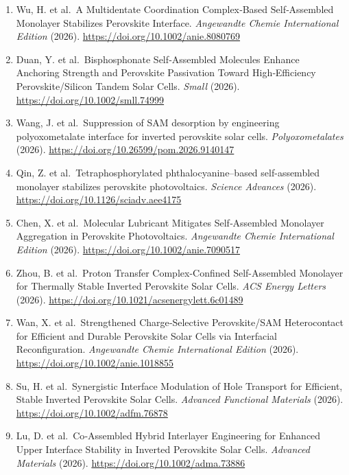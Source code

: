 \documentclass[
  11pt,
]{article}
\begin{document}
\begin{enumerate}
  Li, M. et al.~Improved Mechanical Adhesion Enabled by Bilayer Hole
  Transport Layers in Perovskite Solar Cells. \emph{ACS Materials
  Letters} (2026).
  \url{https://doi.org/10.1021/acsmaterialslett.6c00479}
\item
  Wu, H. et al.~A Multidentate Coordination Complex‐Based Self‐Assembled
  Monolayer Stabilizes Perovskite Interface. \emph{Angewandte Chemie
  International Edition} (2026).
  \url{https://doi.org/10.1002/anie.8080769}
\item
  Duan, Y. et al.~Bisphosphonate Self‐Assembled Molecules Enhance
  Anchoring Strength and Perovskite Passivation Toward High‐Efficiency
  Perovskite/Silicon Tandem Solar Cells. \emph{Small} (2026).
  \url{https://doi.org/10.1002/smll.74999}
\item
  Wang, J. et al.~Suppression of SAM desorption by engineering
  polyoxometalate interface for inverted perovskite solar cells.
  \emph{Polyoxometalates} (2026).
  \url{https://doi.org/10.26599/pom.2026.9140147}
\item
  Qin, Z. et al.~Tetraphosphorylated phthalocyanine--based
  self-assembled monolayer stabilizes perovskite photovoltaics.
  \emph{Science Advances} (2026).
  \url{https://doi.org/10.1126/sciadv.aee4175}
\item
  Chen, X. et al.~Molecular Lubricant Mitigates Self‐Assembled Monolayer
  Aggregation in Perovskite Photovoltaics. \emph{Angewandte Chemie
  International Edition} (2026).
  \url{https://doi.org/10.1002/anie.7090517}
\item
  Zhou, B. et al.~Proton Transfer Complex-Confined Self-Assembled
  Monolayer for Thermally Stable Inverted Perovskite Solar Cells.
  \emph{ACS Energy Letters} (2026).
  \url{https://doi.org/10.1021/acsenergylett.6c01489}
\item
  Wan, X. et al.~Strengthened Charge‐Selective Perovskite/SAM
  Heterocontact for Efficient and Durable Perovskite Solar Cells via
  Interfacial Reconfiguration. \emph{Angewandte Chemie International
  Edition} (2026). \url{https://doi.org/10.1002/anie.1018855}
\item
  Su, H. et al.~Synergistic Interface Modulation of Hole Transport for
  Efficient, Stable Inverted Perovskite Solar Cells. \emph{Advanced
  Functional Materials} (2026). \url{https://doi.org/10.1002/adfm.76878}
\item
  Lu, D. et al.~Co‐Assembled Hybrid Interlayer Engineering for Enhanced
  Upper Interface Stability in Inverted Perovskite Solar Cells.
  \emph{Advanced Materials} (2026).
  \url{https://doi.org/10.1002/adma.73886}

\end{enumerate}
\end{document}
